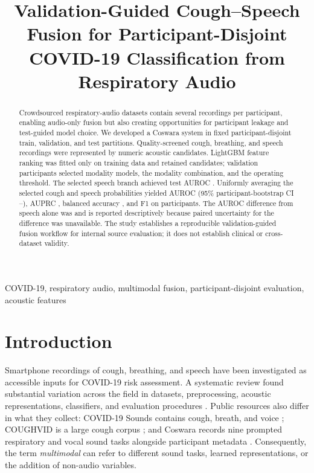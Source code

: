\documentclass[conference]{IEEEtran}
\title{Validation-Guided Cough--Speech Fusion for Participant-Disjoint COVID-19 Classification from Respiratory Audio}
\author{
\IEEEauthorblockN{Nishant Harkut and Ritu Tiwari}
\IEEEauthorblockA{Department of Information Technology\\
Atal Bihari Vajpayee Indian Institute of Information Technology and Management\\
Gwalior, India}
}
\begin{document}
\maketitle

\begin{abstract}
Crowdsourced respiratory-audio datasets contain several recordings per
participant, enabling audio-only fusion but also creating opportunities for
participant leakage and test-guided model choice. We developed a Coswara
system in fixed participant-disjoint train, validation, and test partitions.
Quality-screened cough, breathing, and speech recordings were represented by
\CandidateFeatureCount{} numeric acoustic candidates. LightGBM feature ranking
was fitted only on training data and retained \SelectedFeatureCount{}
candidates; validation participants selected modality models, the modality
combination, and the operating threshold. The selected speech branch achieved
test AUROC \SpeechTestAUROC{}. Uniformly averaging the selected cough and
speech probabilities yielded AUROC \FusionTestAUROC{} (95\% participant-bootstrap
CI \FusionAUCILow{}--\FusionAUCIHigh{}), AUPRC \FusionTestAUPRC{}, balanced
accuracy \FusionTestBalancedAccuracy{}, and F1 \FusionTestFOne{} on
\FusionTestN{} participants. The AUROC difference from speech alone was
\FusionMinusSpeechAUROC{} and is reported descriptively because paired
uncertainty for the difference was unavailable. The study establishes a
reproducible validation-guided fusion workflow for internal source evaluation;
it does not establish clinical or cross-dataset validity.
\end{abstract}

\begin{IEEEkeywords}
COVID-19, respiratory audio, multimodal fusion, participant-disjoint
evaluation, acoustic features
\end{IEEEkeywords}

\section{Introduction}

Smartphone recordings of cough, breathing, and speech have been investigated
as accessible inputs for COVID-19 risk assessment. A systematic review found
substantial variation across the field in datasets, preprocessing, acoustic
representations, classifiers, and evaluation procedures
\cite{aleixandre2022review}. Public resources also differ in what they collect:
COVID-19 Sounds contains cough, breath, and voice \cite{xia2021covid}; COUGHVID
is a large cough corpus \cite{orlandic2021coughvid}; and Coswara records nine
prompted respiratory and vocal sound tasks alongside participant metadata
\cite{bhattacharya2023coswara}. Consequently, the term \emph{multimodal} can
refer to different sound tasks, learned representations, or the addition of
non-audio variables.
\end{document}
